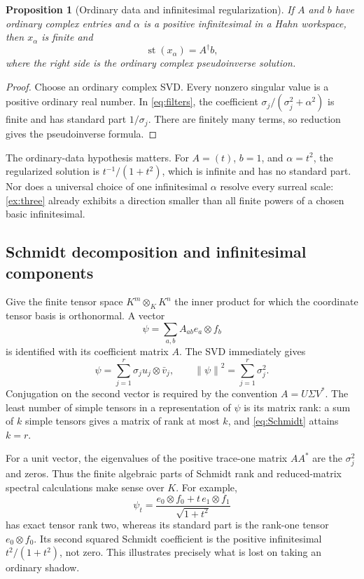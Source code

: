 \documentclass[11pt,a4paper]{article}
\numberwithin{equation}{section}
\newtheorem{proposition}[proposition]{Proposition}
\theoremstyle{definition}
\theoremstyle{remark}
\newcommand{\st}{\operatorname{st}}
\newcommand{\norm}[1]{\left\lVert#1\right\rVert}
\begin{document}
\begin{proposition}[Ordinary data and infinitesimal regularization]
If $A$ and $b$ have ordinary complex entries and $\alpha$ is a positive
infinitesimal in a Hahn workspace, then $x_\alpha$ is finite and
\[
 \st(x_\alpha)=A^\dagger b,
\]
where the right side is the ordinary complex pseudoinverse solution.
\end{proposition}
\begin{proof}
Choose an ordinary complex SVD. Every nonzero singular value is a positive
ordinary real number. In \eqref{eq:filters}, the coefficient
$\sigma_j/(\sigma_j^2+\alpha^2)$ is finite and has standard part
$1/\sigma_j$. There are finitely many terms, so reduction gives the
pseudoinverse formula.
\end{proof}

The ordinary-data hypothesis matters. For $A=(t)$, $b=1$, and
$\alpha=t^2$, the regularized solution is
$t^{-1}/(1+t^2)$, which is infinite and has no standard part. Nor does a
universal choice of one infinitesimal $\alpha$ resolve every surreal scale:
\cref{ex:three} already exhibits a direction smaller than all finite powers
of a chosen basic infinitesimal.

\subsection{Schmidt decomposition and infinitesimal components}
Give the finite tensor space $K^m\otimes_K K^n$ the inner product for which
the coordinate tensor basis is orthonormal. A vector
\[
 \psi=\sum_{a,b}A_{ab}e_a\otimes f_b
\]
is identified with its coefficient matrix $A$. The SVD immediately gives
\begin{equation}\label{eq:Schmidt}
 \psi=\sum_{j=1}^r\sigma_j u_j\otimes\bar v_j,
 \qquad \norm\psi^2=\sum_{j=1}^r\sigma_j^2.
\end{equation}
Conjugation on the second vector is required by the convention
$A=U\Sigma V^*$. The least number of simple tensors in a representation
of $\psi$ is its matrix rank: a sum of $k$ simple tensors gives a matrix
of rank at most $k$, and \eqref{eq:Schmidt} attains $k=r$.

For a unit vector, the eigenvalues of the positive trace-one matrix $AA^*$
are the $\sigma_j^2$ and zeros. Thus the finite algebraic parts of Schmidt
rank and reduced-matrix spectral calculations make sense over $K$.
For example,
\[
 \psi_t=\frac{e_0\otimes f_0+t\,e_1\otimes f_1}{\sqrt{1+t^2}}
\]
has exact tensor rank two, whereas its standard part is the rank-one tensor
$e_0\otimes f_0$. Its second squared Schmidt coefficient is the positive
infinitesimal $t^2/(1+t^2)$, not zero. This illustrates precisely what is
lost on taking an ordinary shadow.
\end{document}
